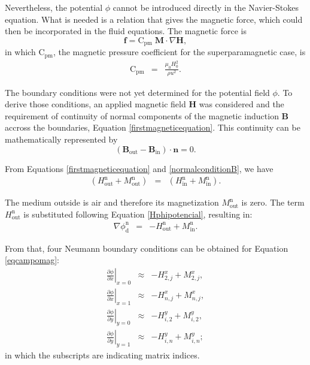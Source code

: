 \documentclass[journal]{IEEEtran}
\begin{document}
Nevertheless, the potential $\phi$ cannot be introduced directly in the Navier-Stokes equation. What is needed is a relation that gives the magnetic force, which could then be incorporated in the fluid equations. The magnetic force is \begin{equation}
	\mathbf{f} = \mathrm{C}_{\mathrm{pm}}\; \mathbf{M}\cdot \nabla \mathbf{H},\label{magneticforce}\end{equation} in which $\mathrm{C}_{\mathrm{pm}}$, the magnetic pressure coefficient for the superparamagnetic case, is \begin{eqnarray}
\mathrm{C}_{\mathrm{pm}} & = & \frac{\mu_0 H_0^2}{\rho u^2}.\label{cpm}
\end{eqnarray}

The boundary conditions were not yet determined for the potential field $\phi$. To derive those conditions, an applied magnetic field $\mathbf{H}$ was considered and the requirement of continuity of normal components of the magnetic induction $\mathbf{B}$ accross the boundaries, Equation \ref{firstmagneticequation}. This continuity can be mathematically represented by \begin{equation}\left(\mathbf{B}_{\mathrm{out}} - \mathbf{B}_{\mathrm{in}}\right)\cdot \mathbf{n} = 0 \label{normalconditionB}.\end{equation} 

From Equations \ref{firstmagneticequation} and \ref{normalconditionB}, we have \begin{eqnarray}
(H_{\mathrm{out}}^{\mathrm{n}} + M_{\mathrm{out}}^{\mathrm{n}}) &=&  (H_{\mathrm{in}}^{\mathrm{n}}+M_{\mathrm{in}}^{\mathrm{n}}).\label{normalConditionB2}
\end{eqnarray}

The medium outside is air and therefore its magnetization $M_{\mathrm{out}}^{\mathrm{n}}$ is zero. The term $H_{\mathrm{out}}^{\mathrm{n}}$ is substituted following  Equation \ref{Hphipotencial}, resulting  in: \begin{eqnarray}
\nabla\phi_{\mathrm{d}}^{\mathrm{n}} & = & -H_{\mathrm{out}}^{\mathrm{n}} + M_{\mathrm{in}}^{\mathrm{n}}. \label{nablaphid}
\end{eqnarray}

From that, four Neumann boundary conditions can be obtained for Equation \ref{eqcampomag}: \begin{eqnarray}
\left.\frac{\partial \phi}{\partial x}\right|_{x=0} &\approx& -H^{x}_{2,j} + M^{x}_{2,j}\label{condition1phi},\\
\left.\frac{\partial \phi}{\partial x}\right|_{x=1} &\approx& -H^{x}_{n,j} + M^{x}_{n,j},\\
\left.\frac{\partial \phi}{\partial y}\right|_{y=0} &\approx& -H^{y}_{i,2} + M^{y}_{i,2},\\
\left.\frac{\partial \phi}{\partial y}\right|_{y=1} &\approx& -H^{y}_{i,n} + M^{y}_{i,n};\label{condition4phi}
\end{eqnarray} in which the subscripts are indicating matrix indices.
\end{document}
